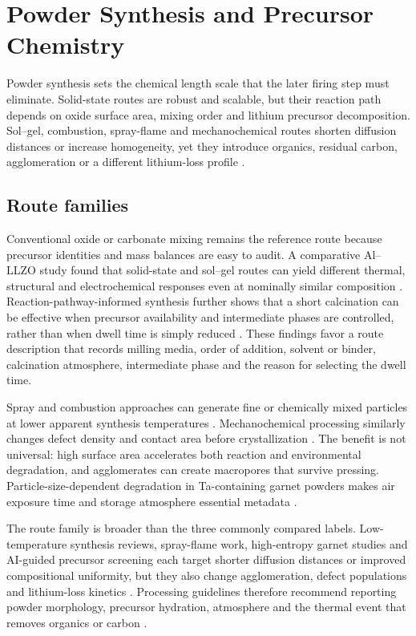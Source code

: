 \section{Powder Synthesis and Precursor Chemistry}
\label{sec:powder}

Powder synthesis sets the chemical length scale that the later firing step must eliminate. Solid-state routes are robust and scalable, but their reaction path depends on oxide surface area, mixing order and lithium precursor decomposition. Sol--gel, combustion, spray-flame and mechanochemical routes shorten diffusion distances or increase homogeneity, yet they introduce organics, residual carbon, agglomeration or a different lithium-loss profile \cite{puente2021garnet,ali2021spray,alizadeh2023synthesis,duvel2012mechanosynthesis,kalita2023recent}.

\subsection{Route families}

Conventional oxide or carbonate mixing remains the reference route because precursor identities and mass balances are easy to audit. A comparative Al--LLZO study found that solid-state and sol--gel routes can yield different thermal, structural and electrochemical responses even at nominally similar composition \cite{kosir2022comparative}. Reaction-pathway-informed synthesis further shows that a short calcination can be effective when precursor availability and intermediate phases are controlled, rather than when dwell time is simply reduced \cite{garman2025reaction}. These findings favor a route description that records milling media, order of addition, solvent or binder, calcination atmosphere, intermediate phase and the reason for selecting the dwell time.

Spray and combustion approaches can generate fine or chemically mixed particles at lower apparent synthesis temperatures \cite{ali2021spray,alizadeh2023synthesis,djenadic2014nebulized}. Mechanochemical processing similarly changes defect density and contact area before crystallization \cite{duvel2012mechanosynthesis}. The benefit is not universal: high surface area accelerates both reaction and environmental degradation, and agglomerates can create macropores that survive pressing. Particle-size-dependent degradation in Ta-containing garnet powders makes air exposure time and storage atmosphere essential metadata \cite{hoinkis2023particle}.

The route family is broader than the three commonly compared labels. Low-temperature synthesis reviews, spray-flame work, high-entropy garnet studies and AI-guided precursor screening each target shorter diffusion distances or improved compositional uniformity, but they also change agglomeration, defect populations and lithium-loss kinetics \cite{kalita2023recent,ali2021spray,feng2023discovery,wang2026ai,kim2025machine,li2026green,li2025phase}. Processing guidelines therefore recommend reporting powder morphology, precursor hydration, atmosphere and the thermal event that removes organics or carbon \cite{balaish2025emerging,puente2021garnet}.

